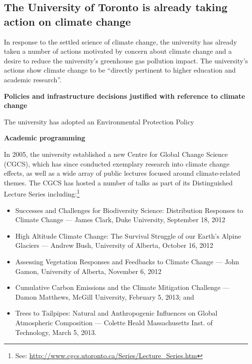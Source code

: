 	\subsection{The University of Toronto is already taking action on climate change}


In response to the settled science of climate change, the university has already taken a number of actions motivated by concern about climate change and a desire to reduce the university's greenhouse gas pollution impact.
The university's actions show climate change to be ``directly pertinent to higher education and academic research''.



\textbf{Policies and infrastructure decisions justified with reference to climate change}

The university has adopted an Environmental Protection Policy







\textbf{Academic programming}



In 2005, the university established a new Centre for Global Change Science (CGCS), which has since conducted exemplary research into climate change effects, as well as a wide array of public lectures focused around climate-related themes. The CGCS has hosted a number of talks as part of its Distinguished Lecture Series including:\footnote{See: \url{http://www.cgcs.utoronto.ca/Series/Lecture_Series.htm}}
\begin{itemize}
	\item Successes and Challenges for Biodiversity Science: Distribution Responses to Climate Change --- James Clark, Duke University, September 18, 2012
	\item High Altitude Climate Change: The Survival Struggle of our Earth’s Alpine Glaciers --- Andrew Bush, University of Alberta, October 16, 2012 
	\item Assessing Vegetation Responses and Feedbacks to Climate Change --- John Gamon, University of Alberta, November 6, 2012
	\item Cumulative Carbon Emissions and the Climate Mitigation Challenge --- Damon Matthews, McGill University, February 5, 2013; and
	\item Trees to Tailpipes: Natural and Anthropogenic Influences on Global Atmospheric Composition --- Colette Heald Massachusetts Inst. of Technology, March 5, 2013.
\end{itemize}



